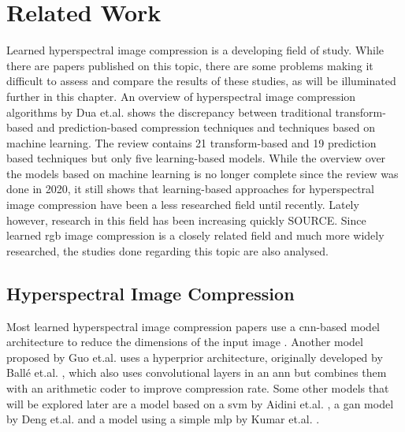 \chapter{Related Work\label{cha:chapter2}}
Learned hyperspectral image compression is a developing field of study. While there are papers published on this topic, there are some problems making it difficult to assess and compare the results of these studies, as will be illuminated further in this chapter. An overview of hyperspectral image compression algorithms by Dua et.al. \citep{dua_comprehensive_2020} shows the discrepancy between traditional transform-based and prediction-based compression techniques and techniques based on machine learning. The review contains 21 transform-based and 19 prediction based techniques but only five learning-based models. While the overview over the models based on machine learning is no longer complete since the review was done in 2020, it still shows that learning-based approaches for hyperspectral image compression have been a less researched field until recently. Lately however, research in this field has been increasing quickly SOURCE.
Since learned \ac{rgb} image compression is a closely related field and much more widely researched, the studies done regarding this topic are also analysed.
\section{Hyperspectral Image Compression \label{sec:ch2hyperspectral}}
Most learned hyperspectral image compression papers use a \ac{cnn}-based model architecture to reduce the dimensions of the input image \citep{kuester_1d-convolutional_2021}\citep{kuester_transferability_2022}\citep{la_grassa_hyperspectral_2022}. Another model proposed by Guo et.al. \citep{guo_learned_2021} uses a hyperprior architecture, originally developed by Ballé et.al. \citep{balle_end--end_2017}, which also uses convolutional layers in an \ac{ann} but combines them with an arithmetic coder to improve compression rate.
Some other models that will be explored later are a model based on a \ac{svm} by Aidini et.al. \citep{aidini_hyperspectral_2019}, a \ac{gan} model by Deng et.al. \citep{deng_learning-based_2020} and a model using a simple \ac{mlp} by Kumar et.al. \citep{leal-taixe_onboard_2019}.
